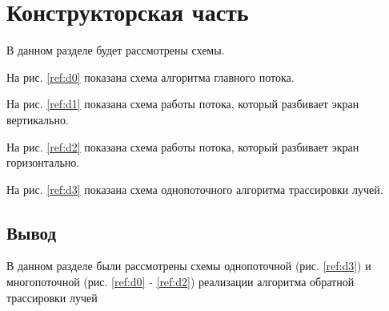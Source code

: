 \chapter{Конструкторская часть}
\label{cha:design}

В данном разделе будет рассмотрены схемы.

На рис. \ref{ref:d0} показана схема алгоритма главного потока.

\begin{figure}[ht!]
\end{figure}

На рис. \ref{ref:d1} показана схема работы потока, который разбивает
экран вертикально.

\begin{figure}[ht!]
\end{figure}

На рис. \ref{ref:d2} показана схема работы потока, который разбивает
экран горизонтально.

\begin{figure}[ht!]
\end{figure}

На рис. \ref{ref:d3} показана схема однопоточного алгоритма трассировки
лучей.

\begin{figure}[ht!]
\end{figure}



\section{Вывод}

В данном разделе были рассмотрены схемы однопоточной (рис. \ref{ref:d3}) и многопоточной
(рис. \ref{ref:d0} - \ref{ref:d2}) реализации алгоритма обратной трассировки лучей






